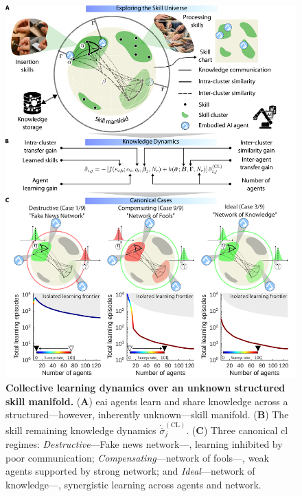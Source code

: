 \documentclass[12pt]{article}
\begin{document}
\begin{figure}[t!]
	\centering
	\hspace*{\fill}
	\includegraphics[width=13cm]{collective_learning_and_skill_manifold_conceptualization.png}
	\hspace*{\fill}
    \caption{\label{fig:collective_learning_and_skill_manifold_conceptualization} 
    	\textbf{Collective learning dynamics over an unknown structured skill manifold.} 
    	(\textbf{A}) \ac{eai} agents learn and share knowledge across a structured---however, inherently unknown---skill manifold. (\textbf{B}) The skill remaining knowledge dynamics $\dot{\bar{\sigma}}^{(\mathrm{CL})}_j$. (\textbf{C}) Three canonical \ac{cl} regimes: \textit{Destructive}---Fake news network---, learning inhibited by poor communication; \textit{Compensating}---network of fools---, weak agents supported by strong network; and \textit{Ideal}---network of knowledge---, synergistic learning across agents and network.        
    }
\end{figure}
\end{document}
